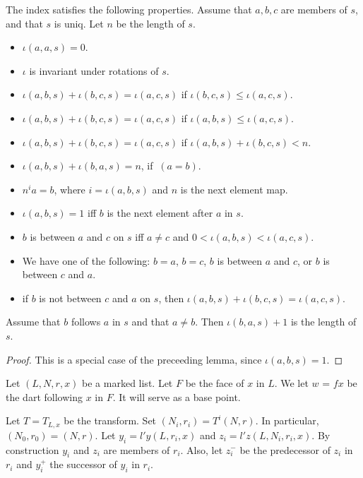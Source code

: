 \begin{lemma}
The index satisfies the following properties.  Assume
that $a,b,c$ are members of $s$, and that $s$ is uniq.  Let $n$ be the length of $s$.
\begin{itemize}
\item $\iota(a,a,s)=0$.
\item $\iota$ is invariant under rotations of $s$.
\item $\iota(a,b,s) + \iota(b,c,s) = \iota(a,c,s)$ if $\iota(b,c,s)\le \iota(a,c,s)$.
\item $\iota(a,b,s) + \iota(b,c,s) = \iota(a,c,s)$ if $\iota(a,b,s)\le \iota(a,c,s)$.
\item $\iota(a,b,s) + \iota(b,c,s) = \iota(a,c,s)$ if $\iota(a,b,s)+\iota(b,c,s) < n$.
\item $\iota(a,b,s) + \iota(b,a,s) = n$, if $~(a=b)$.
\item $n^i a = b$, where $i=\iota(a,b,s)$ and $n$ is the next element map.
\item $\iota(a,b,s)=1$ iff $b$ is the next element after $a$ in $s$.
\item $b$ is between $a$ and $c$ on $s$ iff $a\ne c$ and $0 < \iota(a,b,s) < \iota(a,c,s)$.
\item We have one of the following: $b=a$, $b=c$, $b$ is between $a$ and $c$, or $b$ is between $c$ and $a$.
\item if $b$ is not between $c$ and $a$ on $s$, then $\iota(a,b,s) + \iota(b,c,s) = \iota(a,c,s)$.
\end{itemize}
\end{lemma}

\begin{lemma}
   Assume that $b$ follows $a$ in $s$ and that $a\ne b$. Then
$\iota(b,a,s) + 1$ is the length of $s$.
\end{lemma}

\begin{proof} This is a special case of the preceeding lemma, since $\iota(a,b,s)=1$.
\end{proof}


\begin{remark}[F,~T,~w,~$N_i$,~$r_i$,~$y_i$,~$z_i$]
Let $(L,N,r,x)$ be a marked list.  Let $F$ be the face of $x$ in $L$.
 We let $w$ = $f x$ be the dart following $x$ in $F$.  It will serve
as a base point.

Let $T = T_{L,x}$ be the transform.  Set $(N_i,r_i) = T^i (N,r)$.  In particular,
$(N_0,r_0) = (N,r)$.   Let $y_i = l'y(L,r_i,x)$ and $z_i = l'z (L,N_i,r_i,x)$.
By construction $y_i$ and $z_i$ are members of $r_i$.
Also, let $z_i^-$ be the predecessor of $z_i$ in $r_i$ and $y_i^+$ the successor of
$y_i$ in $r_i$.
\end{remark}

